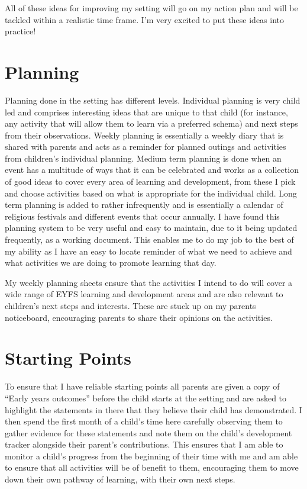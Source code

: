 \documentclass[10pt,a4paper]{report}
\begin{document}
All of these ideas for improving my setting will go on my action plan and will be tackled within a realistic time frame. I'm very excited to put these ideas into practice!

\section{Planning}

Planning done in the setting has different levels. Individual planning is very child led and comprises interesting ideas that are unique to that child (for instance, any activity that will allow them to learn via a preferred schema) and next steps from their observations. Weekly planning is essentially a weekly diary that is shared with parents and acts as a reminder for planned outings and activities from children's individual planning. Medium term planning is done when an event has a multitude of ways that it can be celebrated and works as a collection of good ideas to cover every area of learning and development, from these I pick and choose activities based on what is appropriate for the individual child. Long term planning is added to rather infrequently and is essentially a calendar of religious festivals and different events that occur annually. I have found this planning system to be very useful and easy to maintain, due to it being updated frequently, as a working document. This enables me to do my job to the best of my ability as I have an easy to locate reminder of what we need to achieve and what activities we are doing to promote learning that day. 

My weekly planning sheets ensure that the activities I intend to do will cover a wide range of EYFS learning and development areas and are also relevant to children's next steps and interests. These are stuck up on my parents noticeboard, encouraging parents to share their opinions on the activities.

\section{Starting Points}

To ensure that I have reliable starting points all parents are given a copy of “Early years outcomes” before the child starts at the setting and are asked to highlight the statements in there that they believe their child has demonstrated. I then spend the first month of a child's time here carefully observing them to gather evidence for these statements and note them on the child's development tracker alongside their parent's contributions. This ensures that I am able to monitor a child's progress from the beginning of their time with me and am able to ensure that all activities will be of benefit to them, encouraging them to move down their own pathway of learning, with their own next steps.
\end{document}
